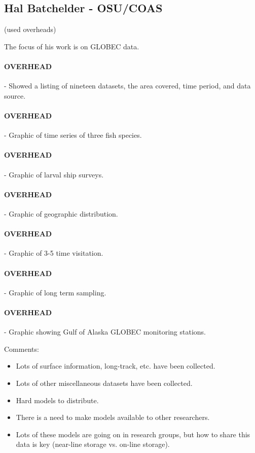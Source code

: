 \subsection{Hal Batchelder - OSU/COAS}

(used overheads)

The focus of his work is on GLOBEC data.

\paragraph{OVERHEAD} - Showed a listing of nineteen datasets, the area
covered, time period, and data source.

\paragraph{OVERHEAD} - Graphic of time series of three fish species.

\paragraph{OVERHEAD} - Graphic of larval ship surveys.

\paragraph{OVERHEAD} - Graphic of geographic distribution.

\paragraph{OVERHEAD} - Graphic of 3-5 time visitation.

\paragraph{OVERHEAD} - Graphic of long term sampling.

\paragraph{OVERHEAD} - Graphic showing Gulf of Alaska GLOBEC monitoring stations.

Comments:
\begin{itemize}
\item Lots of surface information, long-track, etc. have been collected.
\item Lots of other miscellaneous datasets have been collected.
\item Hard models to distribute.
\item There is a need to make models available to other researchers.
\item Lots of these models are going on in research groups, but how to
  share this data is key (near-line storage vs. on-line storage).
\end{itemize}

